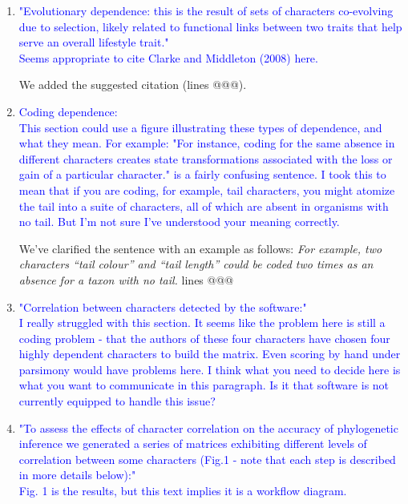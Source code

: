 \documentclass[12pt,letterpaper]{article}
\begin{document}
\begin{enumerate}
\item{\textcolor{blue}{"Evolutionary dependence: this is the result of sets of characters co-evolving due to selection, likely related to functional links between two traits that help serve an overall lifestyle trait."\\
Seems appropriate to cite Clarke and Middleton (2008) here.}}

We added the suggested citation (lines @@@).

\item{\textcolor{blue}{Coding dependence:\\
This section could use a figure illustrating these types of dependence, and what they mean. For example: "For instance, coding for the same absence in different characters creates state transformations associated with the loss or gain of a particular character." is a fairly confusing sentence. I took this to mean that if you are coding, for example, tail characters, you might atomize the tail into a suite of characters, all of which are absent in organisms with no tail. But I'm not sure I've understood your meaning correctly.}}


We've clarified the sentence with an example as follows:
\textit{For example, two characters ``tail colour'' and ``tail length'' could be coded two times as an absence for a taxon with no tail.} lines @@@

\item{\textcolor{blue}{"Correlation between characters detected by the software:"\\
I really struggled with this section. It seems like the problem here is still a coding problem - that the authors of these four characters have chosen four highly dependent characters to build the matrix. Even scoring by hand under parsimony would have problems here. I think what you need to decide here is what you want to communicate in this paragraph. Is it that software is not currently equipped to handle this issue?}}


\item{\textcolor{blue}{"To assess the effects of character correlation on the accuracy of phylogenetic inference we generated a series of matrices exhibiting different levels of correlation between some characters (Fig.1 - note that each step is described in more details below):"\\
Fig. 1 is the results, but this text implies it is a workflow diagram.}}


\end{enumerate}
\end{document}
